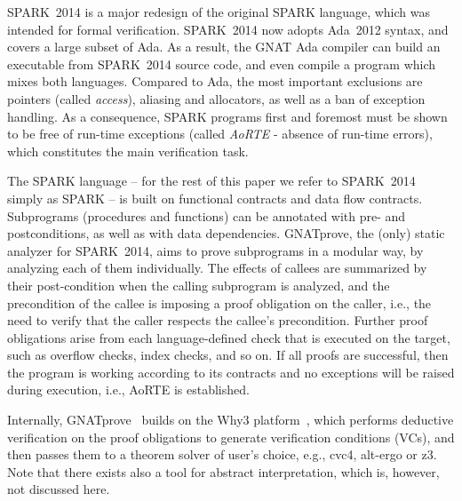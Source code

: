 SPARK~2014 is a major redesign of the original SPARK language, which was intended for formal verification. SPARK~2014 now adopts Ada~2012 syntax, and covers a large subset of Ada. As a result, the GNAT Ada compiler can build
an executable from SPARK~2014 source code, and even compile a program which mixes both languages. Compared to
Ada, the most important exclusions are
pointers (called \emph{access}), aliasing and allocators, as well as a
ban of exception handling.
As a consequence, SPARK programs first and foremost must be shown to
be free of run-time exceptions (called \emph{AoRTE} - absence of
run-time errors), which constitutes the main verification task.

The SPARK language -- for the rest of this paper we refer to SPARK~2014 simply as SPARK -- is built
on functional contracts and data flow contracts. Subprograms (procedures and
functions) can be annotated with pre- and postconditions, as well as with
data dependencies. GNATprove, the (only) static analyzer for SPARK~2014, aims to prove subprograms in a
modular way, by analyzing each of them individually.
The effects of callees are summarized by their
post-condition when the calling subprogram is analyzed, and the
precondition of the callee is imposing a proof obligation on the
caller, i.e., the need to verify that the caller respects the callee's
precondition. Further proof obligations arise from each
language-defined check that is executed on the target, such as
overflow checks, index checks, and so on. If all proofs are successful, 
then the program is working according to its contracts 
and no exceptions will be raised during execution, i.e., AoRTE is established. %


Internally, GNATprove~\cite{GNATprove} builds on the
Why3 platform~\cite{why3}, which performs deductive verification on
the proof obligations to generate verification conditions (VCs), and
then passes them to a theorem solver of user's choice, e.g., cvc4, alt-ergo or z3. Note that there exists also a tool for abstract interpretation, which is, however, not discussed here.



